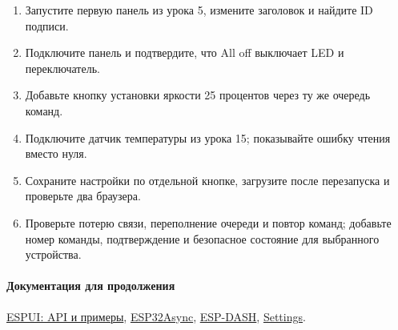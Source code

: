 \begin{tasks}
\begin{enumerate}
  \item {} Запустите первую панель из урока 5, измените заголовок и найдите ID подписи.
  \item {} Подключите панель и подтвердите, что All off выключает LED и переключатель.
  \item {} Добавьте кнопку установки яркости 25 процентов через ту же очередь команд.
  \item {} Подключите датчик температуры из урока 15; показывайте ошибку чтения вместо нуля.
  \item {} Сохраните настройки по отдельной кнопке, загрузите после перезапуска и проверьте два браузера.
  \item {} Проверьте потерю связи, переполнение очереди и повтор команд; добавьте номер команды, подтверждение и безопасное состояние для выбранного устройства.
\end{enumerate}
\end{tasks}

\paragraph{Документация для продолжения}
\href{https://github.com/s00500/ESPUI}{ESPUI: API и примеры},
\href{https://github.com/ESP32Async/ESPAsyncWebServer}{ESP32Async},
\href{https://github.com/ayushsharma82/ESP-DASH}{ESP-DASH},
\href{https://github.com/GyverLibs/Settings}{Settings}.
